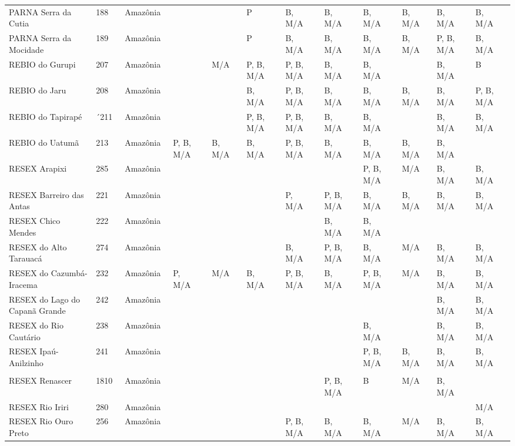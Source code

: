 \documentclass[
  letterpaper,
]{scrbook}
\begin{document}
\begin{longtable}[t]{lllllllll>{}lll}
PARNA Serra da Cutia  & 188  & Amazônia  &  &  & P  & B, M/A  & B, M/A  & B, M/A  & B, M/A  & B, M/A  & B, M/A \\
PARNA Serra da Mocidade  & 189  & Amazônia  &  &  & P  & B, M/A  & B, M/A  & B, M/A  & B, M/A  & P, B, M/A  & B, M/A \\
REBIO do Gurupi  & 207  & Amazônia  &  & M/A  & P, B, M/A  & P, B, M/A  & B, M/A  & B, M/A  &  & B, M/A  & B \\
\addlinespace
REBIO do Jaru  & 208  & Amazônia  &  &  & B, M/A  & P, B, M/A  & B, M/A  & B, M/A  & B, M/A  & B, M/A  & P, B, M/A \\
REBIO do Tapirapé  & ´211  & Amazônia  &  &  & P, B, M/A  & P, B, M/A  & B, M/A  & B, M/A  &  & B, M/A  & B, M/A \\
REBIO do Uatumã  & 213  & Amazônia  & P, B, M/A  & B, M/A  & B, M/A  & P, B, M/A  & B, M/A  & B, M/A  & B, M/A  & B, M/A  & \\
RESEX Arapixi  & 285  & Amazônia  &  &  &  &  &  & P, B, M/A  & M/A  & B, M/A  & B, M/A \\
RESEX Barreiro das Antas  & 221  & Amazônia  &  &  &  & P, M/A  & P, B, M/A  & B, M/A  & B, M/A  & B, M/A  & B, M/A \\
\addlinespace
RESEX Chico Mendes  & 222  & Amazônia  &  &  &  &  & B, M/A  & B, M/A  &  &  & \\
RESEX do Alto Tarauacá  & 274  & Amazônia  &  &  &  & B, M/A  & P, B, M/A  & B, M/A  & M/A  & B, M/A  & B, M/A \\
RESEX do Cazumbá-Iracema  & 232  & Amazônia  & P, M/A  & M/A  & B, M/A  & P, B, M/A  & B, M/A  & P, B, M/A  & M/A  & B, M/A  & B, M/A \\
RESEX do Lago do Capanã Grande  & 242  & Amazônia  &  &  &  &  &  &  &  & B, M/A  & B, M/A \\
RESEX do Rio Cautário  & 238  & Amazônia  &  &  &  &  &  & B, M/A  &  & B, M/A  & B, M/A \\
\addlinespace
RESEX Ipaú-Anilzinho  & 241  & Amazônia  &  &  &  &  &  & P, B, M/A  & B, M/A  & B, M/A  & B, M/A \\
 &  &  &  &  &  &  &  &  &  &  \vphantom{2} & \\
RESEX Renascer  & 1810  & Amazônia  &  &  &  &  & P, B, M/A  & B  & M/A  & B, M/A  & \\
RESEX Rio Iriri  & 280  & Amazônia  &  &  &  &  &  &  &  &  & M/A \\
RESEX Rio Ouro Preto  & 256  & Amazônia  &  &  &  & P, B, M/A  & B, M/A  & B, M/A  & M/A  & B, M/A  & B, M/A \\

\end{longtable}
\end{document}

